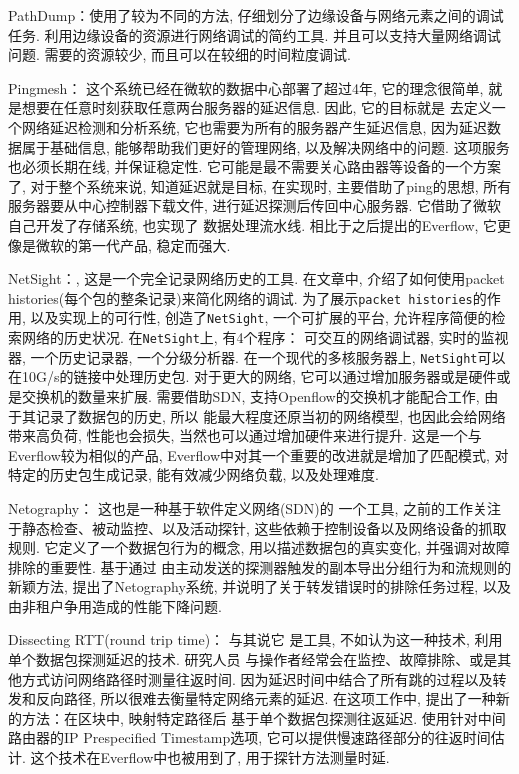 PathDump：\cite{tammana2016simplifying}使用了较为不同的方法,
仔细划分了边缘设备与网络元素之间的调试任务.
利用边缘设备的资源进行网络调试的简约工具. 并且可以支持大量网络调试问题.
需要的资源较少, 而且可以在较细的时间粒度调试.

Pingmesh：\cite{guo2015pingmesh}
这个系统已经在微软的数据中心部署了超过4年, 它的理念很简单,
就是想要在任意时刻获取任意两台服务器的延迟信息. 因此, 它的目标就是
去定义一个网络延迟检测和分析系统, 它也需要为所有的服务器产生延迟信息,
因为延迟数据属于基础信息, 能够帮助我们更好的管理网络,
以及解决网络中的问题. 这项服务也必须长期在线, 并保证稳定性.
它可能是最不需要关心路由器等设备的一个方案了, 对于整个系统来说,
知道延迟就是目标, 在实现时, 主要借助了ping的思想,
所有服务器要从中心控制器下载文件, 进行延迟探测后传回中心服务器.
它借助了微软自己开发了存储系统, 也实现了 数据处理流水线.
相比于之后提出的Everflow, 它更像是微软的第一代产品, 稳定而强大.

NetSight：\cite{handigol2014know}, 这是一个完全记录网络历史的工具.
在文章中, 介绍了如何使用packet histories(每个包的整条记录)来简化网络的调试.
为了展示\texttt{packet\ histories}的作用, 以及实现上的可行性,
创造了\texttt{NetSight}, 一个可扩展的平台,
允许程序简便的检索网络的历史状况. 在\texttt{NetSight}上, 有4个程序：
可交互的网络调试器, 实时的监视器, 一个历史记录器, 一个分级分析器.
在一个现代的多核服务器上,
\texttt{NetSight}可以在10G/s的链接中处理历史包. 对于更大的网络,
它可以通过增加服务器或是硬件或是交换机的数量来扩展. 需要借助SDN,
支持Openflow的交换机才能配合工作, 由于其记录了数据包的历史, 所以
能最大程度还原当初的网络模型, 也因此会给网络带来高负荷, 性能也会损失,
当然也可以通过增加硬件来进行提升. 这是一个与Everflow较为相似的产品,
Everflow中对其一个重要的改进就是增加了匹配模式, 对特定的历史包生成记录,
能有效减少网络负载, 以及处理难度.

Netography：\cite{zhao2016netography} 这也是一种基于软件定义网络(SDN)的
一个工具, 之前的工作关注于静态检查、被动监控、以及活动探针,
这些依赖于控制设备以及网络设备的抓取规则. 它定义了一个数据包行为的概念,
用以描述数据包的真实变化, 并强调对故障排除的重要性. 基于通过
由主动发送的探测器触发的副本导出分组行为和流规则的新颖方法,
提出了Netography系统, 并说明了关于转发错误时的排除任务过程,
以及由非租户争用造成的性能下降问题.

Dissecting RTT(round trip time)：\cite{marchetta2014dissecting} 与其说它
是工具, 不如认为这一种技术, 利用单个数据包探测延迟的技术. 研究人员
与操作者经常会在监控、故障排除、或是其他方式访问网络路径时测量往返时间.
因为延迟时间中结合了所有跳的过程以及转发和反向路径,
所以很难去衡量特定网络元素的延迟.
在这项工作中, 提出了一种新的方法：在区块中, 映射特定路径后
基于单个数据包探测往返延迟. 使用针对中间路由器的IP Prespecified
Timestamp选项, 它可以提供慢速路径部分的往返时间估计.
这个技术在Everflow中也被用到了, 用于探针方法测量时延.

